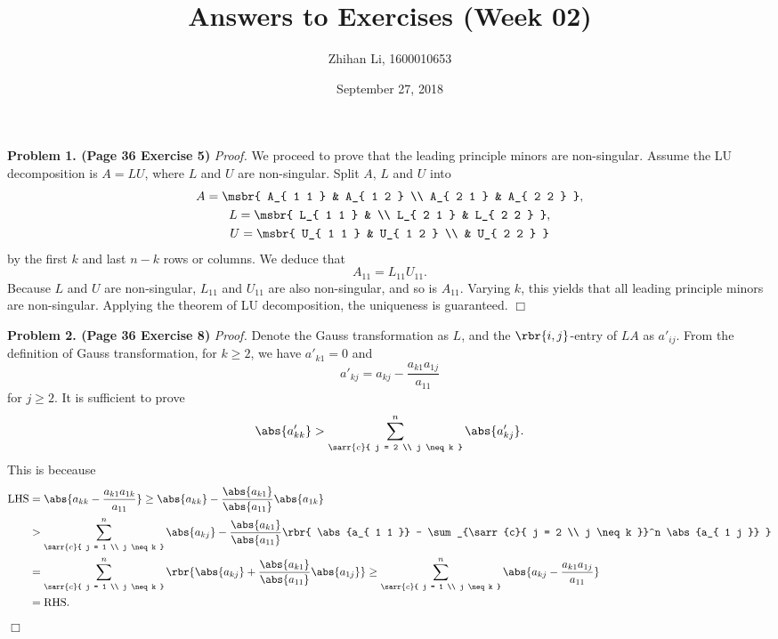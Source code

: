 \documentclass[english, nochinese]{pnote}
\title{Answers to Exercises (Week 02)}
\author{Zhihan Li, 1600010653}
\date{September 27, 2018}
\begin{document}
\maketitle

\textbf{Problem 1. (Page 36 Exercise 5)} \textit{Proof.} We proceed to prove that the leading principle minors are non-singular. Assume the LU decomposition is $ A = L U $, where $L$ and $U$ are non-singular. Split $A$, $L$ and $U$ into
\begin{gather}
A = \msbr{ A_{ 1 1 } & A_{ 1 2 } \\ A_{ 2 1 } & A_{ 2 2 } }, \\
L = \msbr{ L_{ 1 1 } & \\ L_{ 2 1 } & L_{ 2 2 } }, \\
U = \msbr{ U_{ 1 1 } & U_{ 1 2 } \\ & U_{ 2 2 } }
\end{gather}
by the first $k$ and last $ n - k $ rows or columns. We deduce that
\begin{equation}
A_{ 1 1 } = L_{ 1 1 } U_{ 1 1 }.
\end{equation}
Because $L$ and $U$ are non-singular, $ L_{ 1 1 } $ and $ U_{ 1 1 } $ are also non-singular, and so is $ A_{ 1 1 } $. Varying $k$, this yields that all leading principle minors are non-singular. Applying the theorem of LU decomposition, the uniqueness is guaranteed.
\hfill$\Box$

\textbf{Problem 2. (Page 36 Exercise 8)} \textit{Proof.} Denote the Gauss transformation as $L$, and the $ \rbr{ i, j } $-entry of $ L A $ as $ a'_{ i j } $. From the definition of Gauss transformation, for $ k \ge 2 $, we have $ a'_{ k 1 } = 0 $ and
\begin{equation}
a'_{ k j } = a_{ k j } - \frac{ a_{ k 1 } a_{ 1 j } }{a_{ 1 1 }}
\end{equation}
for $ j \ge 2 $.
It is sufficient to prove
\begin{equation}
\abs{a'_{ k k }} > \sum_{\sarr{c}{ j = 2 \\ j \neq k }}^n \abs{a'_{ k j }}.
\end{equation}
This is beceause
\begin{equation}
\begin{split}
\text{LHS} &= \abs{ a_{ k k } - \frac{ a_{ k 1 } a_{ 1 k } }{a_{ 1 1 }} } \ge \abs{a_{ k k }} - \frac{\abs{a_{ k 1 }}}{\abs{a_{ 1 1 }}} \abs{a_{ 1 k }} \\
&> \sum_{\sarr{c}{ j = 1 \\ j \neq k }}^n \abs{a_{ k j }} - \frac{\abs{a_{ k 1 }}}{\abs{a_{ 1 1 }}} \rbr{ \abs{a_{ 1 1 }} - \sum_{\sarr{c}{ j = 2 \\ j \neq k }}^n \abs{a_{ 1 j }} } \\
&= \sum_{\sarr{c}{ j = 1 \\ j \neq k }}^n \rbr{ \abs{a_{ k j }} + \frac{\abs{a_{ k 1 }}}{\abs{a_{ 1 1 }}} \abs{a_{ 1 j }} } \ge \sum_{\sarr{c}{ j = 1 \\ j \neq k }}^n \abs{ a_{ k j } - \frac{ a_{ k 1 } a_{ 1 j } }{a_{ 1 1 }} } \\
&= \text{RHS}.
\end{split}
\end{equation}
\hfill$\Box$
\end{document}
